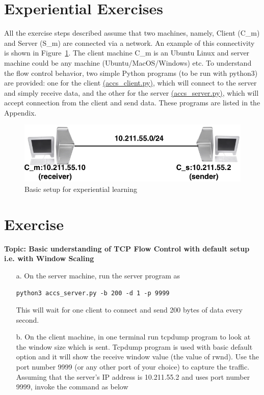 \begin{multicols}{2}
\section{Experiential Exercises}

All the exercise steps described assume that two machines, namely, Client (C\_m) and Server (S\_m) are connected via a network. An example of this connectivity is shown in Figure~\ref{chap3-fig04}. The client machine C\_m is an Ubuntu Linux and server machine could be any machine (Ubuntu/MacOS/Windows) etc. To understand the flow control behavior, two simple Python programs (to be run with python3) are provided: one for the client \url{(accs_client.py)}, which will connect to the server and simply receive data, and the other for the server \url{(accs_server.py)}, which will accept connection from the client and send data. These programs are listed in the Appendix.
\begin{figure}[H]
\centering
\includegraphics[scale=1.4]{src/Figures/chap3/chap3-fig04.jpg}
\caption{ Basic setup for experiential learning}\label{chap3-fig04}
\end{figure}

\setcounter{section}{0}
\section{Exercise}\label{chap3-Exe1}

\textbf{Topic: Basic understanding of TCP Flow Control with default setup i.e. with Window Scaling}
\begin{itemize}
\item[a.] On the server machine, run the server program as 

\texttt{python3  accs\_server.py -b 200 -d 1 -p 9999}

This will wait for one client to connect and send 200 bytes of data every second.

\item[b.] On the client machine, in one terminal run tcpdump program to look at the window size which is sent. Tcpdump program is used with basic default option and it will show the receive window value (the value of rwnd).  Use the port number 9999 (or any other port of your choice) to capture the traffic. Assuming that the server’s IP address is 10.211.55.2 and uses port number 9999, invoke the command as below


\end{itemize}
\end{multicols}
